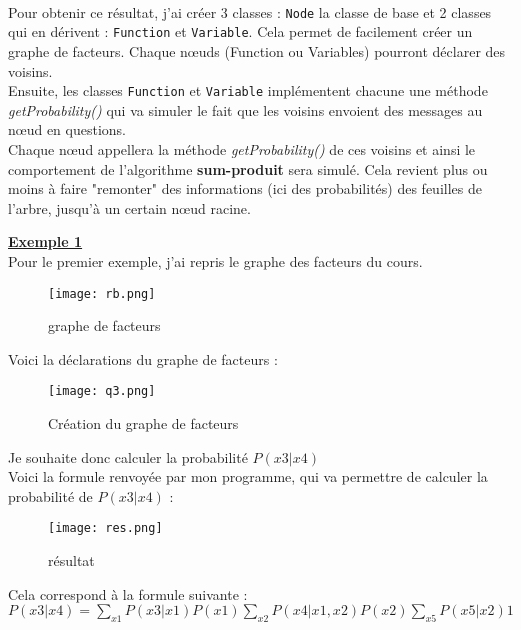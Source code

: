 \documentclass[12pt]{article}
\begin{document}
\paragraph{}
Pour obtenir ce résultat, j'ai créer 3 classes : \texttt{Node} la classe de base et 2 classes qui en dérivent : \texttt{Function} et \texttt{Variable}. Cela permet de facilement créer un graphe de facteurs. Chaque nœuds (Function ou Variables) pourront déclarer des voisins. \\
Ensuite, les classes \texttt{Function} et \texttt{Variable} implémentent chacune une méthode \textit{getProbability()} qui va simuler le fait que les voisins envoient des messages au nœud en questions. \\
Chaque nœud appellera la méthode \textit{getProbability()} de ces voisins et ainsi le comportement de l'algorithme \textbf{sum-produit} sera simulé. Cela revient plus ou moins à faire "remonter" des informations (ici des probabilités) des feuilles de l'arbre, jusqu'à un certain nœud racine.
\\ \linebreak

\textbf{\underline{Exemple 1}}
\\
Pour le premier exemple, j'ai repris le graphe des facteurs du cours.
\begin{figure}[H]
\begin{center}
	\texttt{[image: rb.png]}
	\caption{graphe de facteurs}
\end{center}
\end{figure}
Voici la déclarations du graphe de facteurs : 
\\
\begin{figure}[H]
\begin{center}
	\texttt{[image: q3.png]}
	\caption{Création du graphe de facteurs}
	\label{fig:Exemple}
\end{center}
\end{figure}
Je souhaite donc calculer la probabilité $ P(x3 | x4) $ \\
Voici la formule renvoyée par mon programme, qui va permettre de calculer la probabilité de $P(x3|x4)$ :
\begin{figure}[H]
\begin{center}
	\texttt{[image: res.png]}
	\caption{résultat}
\end{center}
\end{figure}
Cela correspond à la formule suivante : \\ 
$P(x3|x4) = \sum_{x1} P(x3|x1) P(x1) \sum_{x2} P(x4|x1, x2) P(x2) \sum_{x5} P(x5|x2) 1 $
\end{document}
